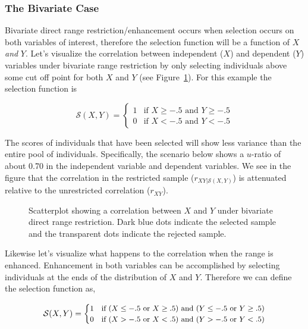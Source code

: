 \documentclass[
  letterpaper,
  DIV=11,
  numbers=noendperiod]{scrreprt}
\begin{document}
\subsubsection*{The Bivariate Case}\label{the-bivariate-case-1}

Bivariate direct range restriction/enhancement occurs when selection
occurs on both variables of interest, therefore the selection function
will be a function of \(X\) \emph{and} \(Y\). Let's visualize the
correlation between independent (\(X\)) and dependent (\(Y\)) variables
under bivariate range restriction by only selecting individuals above
some cut off point for both \(X\) and \(Y\) (see
Figure~\ref{fig-bvdrr}). For this example the selection function is

\[
\mathcal{S}(X,Y) = \begin{cases}1 & \text{if } X\geq -.5 \text{ and }Y\geq-.5\\ 0 & \text{if }X<-.5  \text{ and }Y<-.5 \end{cases}
\]

The scores of individuals that have been selected will show less
variance than the entire pool of individuals. Specifically, the scenario
below shows a \(u\)-ratio of about 0.70 in the independent variable and
dependent variables. We see in the figure that the correlation in the
restricted sample (\(r_{XY|\mathcal{S}(X,Y)}\)) is attenuated relative
to the unrestricted correlation (\(r_{XY}\)).

\begin{figure}[H]


\caption{\label{fig-bvdrr}Scatterplot showing a correlation between
\(X\) and \(Y\) under bivariate direct range restriction. Dark blue dots
indicate the selected sample and the transparent dots indicate the
rejected sample.}

\end{figure}%

Likewise let's visualize what happens to the correlation when the range
is enhanced. Enhancement in both variables can be accomplished by
selecting individuals at the ends of the distribution of \(X\) and
\(Y\). Therefore we can define the selection function as,

\[
\small{\mathcal{S}(X,Y) = \begin{cases}1 & \text{if } (X\leq -.5 \text{ or } X\geq .5) \text{ and } (Y\leq -.5 \text{ or } Y\geq .5) \\ 0 & \text{if }(X>-.5 \text{ or }X<.5)  \text{ and }(Y>-.5 \text{ or }Y<.5) \end{cases}}
\]
\end{document}
